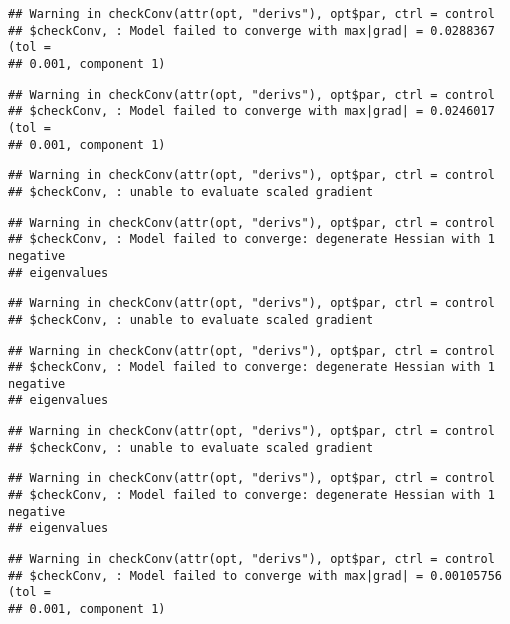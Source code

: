 \documentclass[]{article}
\begin{document}
\begin{verbatim}
## Warning in checkConv(attr(opt, "derivs"), opt$par, ctrl = control
## $checkConv, : Model failed to converge with max|grad| = 0.0288367 (tol =
## 0.001, component 1)
\end{verbatim}

\begin{verbatim}
## Warning in checkConv(attr(opt, "derivs"), opt$par, ctrl = control
## $checkConv, : Model failed to converge with max|grad| = 0.0246017 (tol =
## 0.001, component 1)
\end{verbatim}

\begin{verbatim}
## Warning in checkConv(attr(opt, "derivs"), opt$par, ctrl = control
## $checkConv, : unable to evaluate scaled gradient
\end{verbatim}

\begin{verbatim}
## Warning in checkConv(attr(opt, "derivs"), opt$par, ctrl = control
## $checkConv, : Model failed to converge: degenerate Hessian with 1 negative
## eigenvalues
\end{verbatim}

\begin{verbatim}
## Warning in checkConv(attr(opt, "derivs"), opt$par, ctrl = control
## $checkConv, : unable to evaluate scaled gradient
\end{verbatim}

\begin{verbatim}
## Warning in checkConv(attr(opt, "derivs"), opt$par, ctrl = control
## $checkConv, : Model failed to converge: degenerate Hessian with 1 negative
## eigenvalues
\end{verbatim}

\begin{verbatim}
## Warning in checkConv(attr(opt, "derivs"), opt$par, ctrl = control
## $checkConv, : unable to evaluate scaled gradient
\end{verbatim}

\begin{verbatim}
## Warning in checkConv(attr(opt, "derivs"), opt$par, ctrl = control
## $checkConv, : Model failed to converge: degenerate Hessian with 1 negative
## eigenvalues
\end{verbatim}

\begin{verbatim}
## Warning in checkConv(attr(opt, "derivs"), opt$par, ctrl = control
## $checkConv, : Model failed to converge with max|grad| = 0.00105756 (tol =
## 0.001, component 1)
\end{verbatim}
\end{document}
